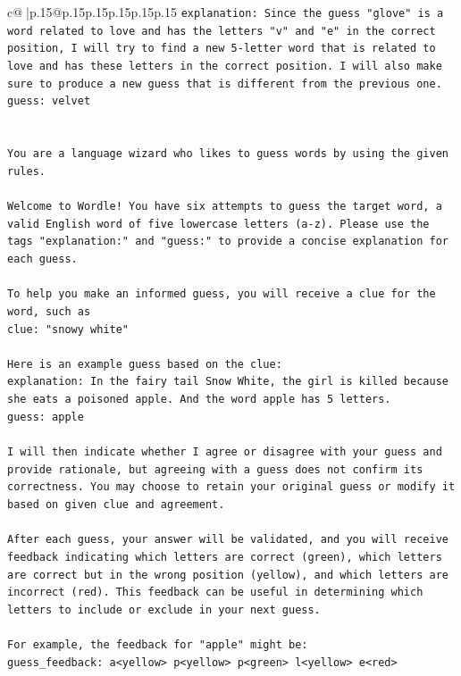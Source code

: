 \documentclass{article}
\begin{document}
{\begin{supertabular}{c@{$\;$}|p{.15\linewidth}@{}p{.15\linewidth}p{.15\linewidth}p{.15\linewidth}p{.15\linewidth}p{.15\linewidth}}
{{{\texttt{explanation: Since the guess "glove" is a word related to love and has the letters "v" and "e" in the correct position, I will try to find a new 5{-}letter word that is related to love and has these letters in the correct position. I will also make sure to produce a new guess that is different from the previous one.} \\
\texttt{guess: velvet} \\
\\ 
\\ 
\texttt{You are a language wizard who likes to guess words by using the given rules.} \\
\\ 
\texttt{Welcome to Wordle! You have six attempts to guess the target word, a valid English word of five lowercase letters (a{-}z). Please use the tags "explanation:" and "guess:" to provide a concise explanation for each guess.} \\
\\ 
\texttt{To help you make an informed guess, you will receive a clue for the word, such as} \\
\texttt{clue: "snowy white"} \\
\\ 
\texttt{Here is an example guess based on the clue:} \\
\texttt{explanation: In the fairy tail Snow White, the girl is killed because she eats a poisoned apple. And the word apple has 5 letters.} \\
\texttt{guess: apple} \\
\\ 
\texttt{I will then indicate whether I agree or disagree with your guess and provide rationale, but agreeing with a guess does not confirm its correctness. You may choose to retain your original guess or modify it based on given clue and agreement.} \\
\\ 
\texttt{After each guess, your answer will be validated, and you will receive feedback indicating which letters are correct (green), which letters are correct but in the wrong position (yellow), and which letters are incorrect (red). This feedback can be useful in determining which letters to include or exclude in your next guess.} \\
\\ 
\texttt{For example, the feedback for "apple" might be:} \\
\texttt{guess\_feedback: a<yellow> p<yellow> p<green> l<yellow> e<red>} \\
}}}
\end{supertabular}}
\end{document}
